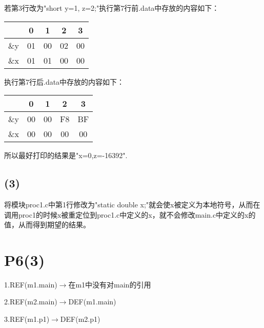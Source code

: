 \documentclass{article}
\begin{document}
若第3行改为"short y=1, z=2;"执行第7行前.data中存放的内容如下：
\begin{table}[h]
	\begin{center} %
	  \begin{tabular}{c|c|c|c|c} %
		\textbf{} & \textbf{0} & \textbf{1} & \textbf{2} & \textbf{3}\\
		\hline
		\&y & 01 & 00 & 02 & 00 \\
		\hline
		\&x & 01 & 01 & 00 & 00 \\
		
	  \end{tabular}
	\end{center}
\end{table}

执行第7行后.data中存放的内容如下：
\newpage
\begin{table}[h]
	\begin{center} %
	  \begin{tabular}{c|c|c|c|c} %
		\textbf{} & \textbf{0} & \textbf{1} & \textbf{2} & \textbf{3}\\
		\hline
		\&y & 00 & 00 & F8 & BF \\
		\hline
		\&x & 00 & 00 & 00 & 00 \\
		
	  \end{tabular}
	\end{center}
\end{table}

所以最好打印的结果是"x=0,z=-16392".

\subsection*{(3)}

将模块proc1.c中第1行修改为"static double x;"就会使x被定义为本地符号，从而在调用proc1的时候x被重定位到proc1.c中定义的x，就不会修改main.c中定义的x的值，从而得到期望的结果。


\section*{P6(3)}
1.REF(m1.main)$\longrightarrow$在m1中没有对main的引用

2.REF(m2.main)$\longrightarrow$DEF(m1.main)

3.REF(m1.p1)$\longrightarrow$DEF(m2.p1)
\end{document}
